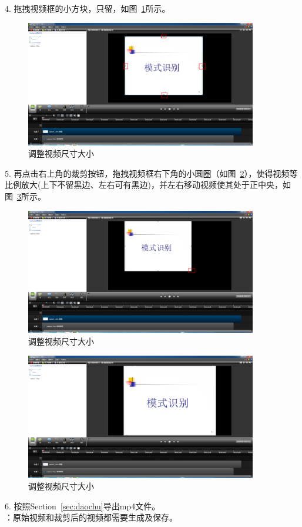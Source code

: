 \documentclass[12pt]{article}
\begin{document}
4. 拖拽视频框的小方块，只留{\color{blue}{ppt部分}}，如图~\ref{fig:fig12}所示。\par
     \begin{figure}
    \centering
    \includegraphics[width=0.9\textwidth]{fig12.png}
    \caption{调整视频尺寸大小}
    \label{fig:fig12}
    \end{figure}
5. 再点击右上角的裁剪按钮，拖拽视频框右下角的小圆圈（如图~\ref{fig:fig13}），使得视频等比例放大(上下不留黑边、左右可有黑边)，并左右移动视频使其处于正中央，如图~\ref{fig:fig14}所示。\par
     \begin{figure}
    \centering
    \includegraphics[width=0.9\textwidth]{fig13.png}
    \caption{调整视频尺寸大小}
    \label{fig:fig13}
    \end{figure}
         \begin{figure}
    \centering
    \includegraphics[width=0.9\textwidth]{fig14.png}
    \caption{调整视频尺寸大小}
    \label{fig:fig14}
    \end{figure}
6. 按照Section~\ref{sec:daochu}导出mp4文件。\\
{\color{blue}{注}}：原始视频和裁剪后的视频都需要生成及保存。



\end{document}
